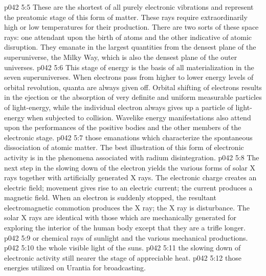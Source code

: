 \pc \vs p042 5:5 \bibnobreakspace {} These are the shortest of all purely electronic vibrations and represent the preatomic stage of this form of matter. These rays require extraordinarily high or low temperatures for their production. There are two sorts of these space rays: one attendant upon the birth of atoms and the other indicative of atomic disruption. They emanate in the largest quantities from the densest plane of the superuniverse, the Milky Way, which is also the densest plane of the outer universes.
\pc \vs p042 5:6 \bibnobreakspace {} This stage of energy is the basis of all materialization in the seven superuniverses. When electrons pass from higher to lower energy levels of orbital revolution, quanta are always given off. Orbital shifting of electrons results in the ejection or the absorption of very definite and uniform measurable particles of light\hyp{}energy, while the individual electron always gives up a particle of light\hyp{}energy when subjected to collision. Wavelike energy manifestations also attend upon the performances of the positive bodies and the other members of the electronic stage.
\pc \vs p042 5:7 \bibnobreakspace {}those emanations which characterize the spontaneous dissociation of atomic matter. The best illustration of this form of electronic activity is in the phenomena associated with radium disintegration.
\pc \vs p042 5:8 \bibnobreakspace {} The next step in the slowing down of the electron yields the various forms of solar X rays together with artificially generated X rays. The electronic charge creates an electric field; movement gives rise to an electric current; the current produces a magnetic field. When an electron is suddenly stopped, the resultant electromagnetic commotion produces the X ray; the X ray is  disturbance. The solar X rays are identical with those which are mechanically generated for exploring the interior of the human body except that they are a trifle longer.
\pc \vs p042 5:9 \bibnobreakspace {} or chemical rays of sunlight and the various mechanical productions.
\pc \vs p042 5:10 \bibnobreakspace {}the whole visible light of the suns.
\pc \vs p042 5:11 \bibnobreakspace {}the slowing down of electronic activity still nearer the stage of appreciable heat.
\pc \vs p042 5:12 \bibnobreakspace {}those energies utilized on Urantia for broadcasting.
